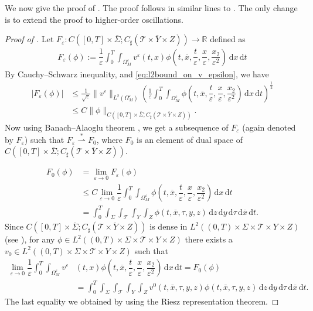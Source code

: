 \documentclass[11pt]{article}
\def\es{\varepsilon}
\def\omm{\Omega_M^\varepsilon}
\def\mint{\int_{0}^{T}\int_{\Sigma}\int_{\mathcal{T}}\int_{Y}\int_{Z}}
\def\dzdy{\di{z}\di{y}\di{\tau}\di{\overline{x}}\di{t}}
\def\T{\mathcal{T}}
\newcommand{\di}[1]{\,\mathrm{d}#1}
\begin{document}
We now give the proof of . The proof follows in similar lines to \cite[Proposition 4.2]{neuss2007effective}. The only change is to extend the proof to higher-order oscillations.
    \begin{proof}[Proof of ]
	      
	    
	    Let $F_{\es}: C([0,T]\times\overline{\Sigma};C_{\sharp}( \overline{\T\times Y\times Z}))\rightarrow \mathbb{R}$ defined as
	    \begin{align*}
	        F_\es (\phi):=\dfrac{1}{\es} \int_0^T\int_{\omm} v^\es (t,x)\phi\left(t,\overline{x},\dfrac{t}{\es}, \dfrac{x}{\es},\dfrac{x_2}{\es^2}\right)\di{x}\di{t}
	    \end{align*}
	    By Cauchy–Schwarz inequality,  and \eqref{eq:l2bound_on_v_epsilon}, we have 
	    \begin{align*}
	        |F_\es (\phi)|&\leq\frac{1}{\sqrt{\es}}\|v^\es\|_{L^2(\omm)}\left(\frac{1}{\es}\int_0^T\int_{\omm}\phi\left(t,\overline{x},\dfrac{t}{\es}, \dfrac{x}{\es},\dfrac{x_2}{\es^2}\right)\di{x}\di{t}\right)^\frac12 \\
            &\leq C \|\phi\|_{C([0,T]\times\overline{\Sigma};C_{\sharp}( \overline{\T\times Y\times Z}))}.
	    \end{align*}
	 Now using Banach–Alaoglu theorem \cite[Theorem 3.15]{rudin1991functional}, we get a subsequence of $F_{\es}$ (again denoted by $F_{\es}$) such that $F_{\es}\overset{\ast}{\rightharpoonup} F_0$, where $F_0$ is an element of dual space of $C([0,T]\times\overline{\Sigma};C_{\sharp}( \overline{\T\times Y\times Z}))$. 
	 
	 \begin{align*}
	     F_{0}(\phi)&=\lim_{\es\rightarrow 0} F_{\es}(\phi)\\
	     &\leq C  \lim_{\es\rightarrow 0}  \dfrac{1}{\es}\int_0^T\int_{\omm}\phi\left(t,\overline{x},\dfrac{t}{\es}, \dfrac{x}{\es},\dfrac{x_2}{\es^2}\right)\di{x}\di{t}\\
	     &=\mint \phi(t,\overline{x},\tau,y,z) \dzdy.
	 \end{align*}
	 	Since $C([0,T]\times\overline{\Sigma};C_{\sharp}( \overline{\T\times Y\times Z}))$ is dense in $L^2((0,T)\times \Sigma\times {\T\times Y\times Z})$ (see \cite[Lemma 4.3]{neuss2007effective}),  for any $\phi\in L^2((0,T)\times \Sigma\times {\T\times Y\times Z})$ there exists a $v_0\in L^2((0,T)\times \Sigma\times \T\times Y\times Z)$ such that
	 	\begin{align*}
	 	    \lim_{\es\rightarrow 0} \dfrac{1}{\es} \int_0^T\int_{\omm} v^\es &(t,x)\phi\left(t,\overline{x},\dfrac{t}{\es}, \dfrac{x}{\es},\dfrac{x_2}{\es^2}\right)\di{x}\di{t}= F_0(\phi)\\
	 	    &=\mint v^0(t,\bar x ,\tau,y,z)\phi(t,\bar x,\tau,y,z)\dzdy.
	 	\end{align*}
	 	The last equality we obtained by using the Riesz representation theorem.
	\end{proof}
\end{document}
